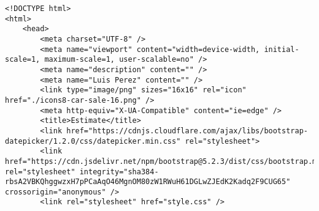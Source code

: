 \makeatletter
\makeatother
\begin{lstlisting}[style=htmlcssjs]
<!DOCTYPE html>
<html>
    <head>
        <meta charset="UTF-8" />
        <meta name="viewport" content="width=device-width, initial-scale=1, maximum-scale=1, user-scalable=no" />
        <meta name="description" content="" />
        <meta name="Luis Perez" content="" />
        <link type="image/png" sizes="16x16" rel="icon" href="./icons8-car-sale-16.png" />
        <meta http-equiv="X-UA-Compatible" content="ie=edge" />
        <title>Estimate</title>
        <link href="https://cdnjs.cloudflare.com/ajax/libs/bootstrap-datepicker/1.2.0/css/datepicker.min.css" rel="stylesheet">
        <link href="https://cdn.jsdelivr.net/npm/bootstrap@5.2.3/dist/css/bootstrap.min.css" rel="stylesheet" integrity="sha384-rbsA2VBKQhggwzxH7pPCaAqO46MgnOM80zW1RWuH61DGLwZJEdK2Kadq2F9CUG65" crossorigin="anonymous" />
        <link rel="stylesheet" href="style.css" />
        

\end{lstlisting}
